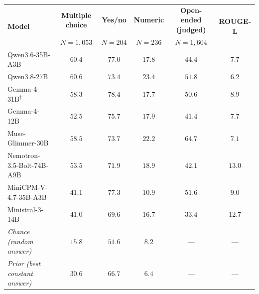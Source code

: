 \begin{tabular}{lccccc}
\toprule
\multirow{2}{*}{\textbf{Model}} & \textbf{Multiple choice} & \textbf{Yes/no} & \textbf{Numeric} & \textbf{Open-ended (judged)} & \multirow{2}{*}{\textbf{ROUGE-L}} \\
 & $N=1{,}053$ & $N=204$ & $N=236$ & $N=1{,}604$ & \\
\midrule
Qwen3.6-35B-A3B & $60.4$ & $77.0$ & $17.8$ & $44.4$ & $7.7$ \\
Qwen3.8-27B & $\mathbf{60.6}$ & $73.4$ & $\mathbf{23.4}$ & $51.8$ & $6.2$ \\
Gemma-4-31B$^\dagger$ & $58.3$ & $\mathbf{78.4}$ & $17.7$ & $50.6$ & $8.9$ \\
Gemma-4-12B & $52.5$ & $75.7$ & $17.9$ & $41.4$ & $7.7$ \\
Muse-Glimmer-30B & $58.5$ & $73.7$ & $22.2$ & $\mathbf{64.7}$ & $7.1$ \\
Nemotron-3.5-Bolt-74B-A9B & $53.5$ & $71.9$ & $18.9$ & $42.1$ & $\mathbf{13.0}$ \\
MiniCPM-V-4.7-35B-A3B & $41.1$ & $77.3$ & $10.9$ & $51.6$ & $9.0$ \\
Ministral-3-14B & $41.0$ & $69.6$ & $16.7$ & $33.4$ & $12.7$ \\
\midrule
\textit{Chance (random answer)} & $15.8$ & $51.6$ & $8.2$ & --- & --- \\
\textit{Prior (best constant answer)} & $30.6$ & $66.7$ & $6.4$ & --- & --- \\
\bottomrule
\end{tabular}

